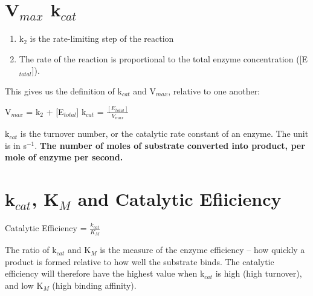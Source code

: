 \section{V$_{max}$ k$_{cat}$}

\begin{center}
\end{center}

\begin{enumerate}
\item k$_2$ is the rate-limiting step of the reaction
\item The rate of the reaction is proportional to the total enzyme concentration ([E$_{total}$]).
\end{enumerate}

This gives us the definition of k$_{cat}$ and V$_{max}$, relative to one another:

\begin{center}
V$_{max}$ = k$_2$ + [E$_{total}$] \ch{->} k$_{cat}$ = $\frac{[E_{total}]}{V_{max}}$
\end{center}

k$_{cat}$ is the turnover number, or the catalytic rate constant of an enzyme.
The unit is in s$^{-1}$.
\textbf{The number of moles of substrate converted into product, per mole of enzyme per second.}

\section{k$_{cat}$, K$_M$ and Catalytic Efiiciency}

\begin{center}
Catalytic Efficiency = $\frac{k_{cat}}{K_M}$
\end{center}

The ratio of k$_{cat}$ and K$_M$ is the measure of the enzyme efficiency -- how quickly a product is formed relative to how well the substrate binds.
The catalytic efficiency will therefore have the highest value when k$_{cat}$ is high (high turnover), and low K$_M$ (high binding affinity).
